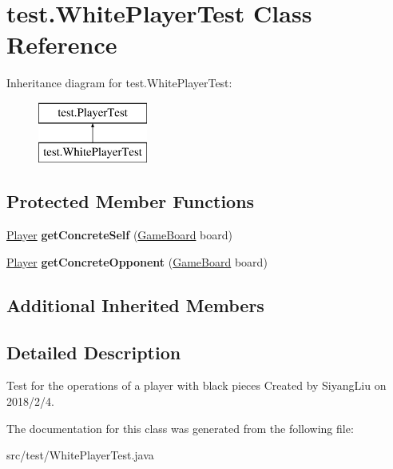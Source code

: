 \hypertarget{classtest_1_1_white_player_test}{}\section{test.\+White\+Player\+Test Class Reference}
\label{classtest_1_1_white_player_test}
Inheritance diagram for test.\+White\+Player\+Test\+:\begin{figure}[H]
\begin{center}
\leavevmode
\includegraphics[height=2.000000cm]{classtest_1_1_white_player_test}
\end{center}
\end{figure}
\subsection*{Protected Member Functions}
\begin{DoxyCompactItemize}
\item 
\mbox{\label{classtest_1_1_white_player_test_aa42ecc7ee1e37ba91c93278aeb4b56b7}} 
\mbox{\hyperlink{classplayers_1_1_player}{Player}} {\bfseries get\+Concrete\+Self} (\mbox{\hyperlink{classgameboard_1_1_game_board}{Game\+Board}} board)
\item 
\mbox{\label{classtest_1_1_white_player_test_abbc91632815e5a42f3e2f40094b8a120}} 
\mbox{\hyperlink{classplayers_1_1_player}{Player}} {\bfseries get\+Concrete\+Opponent} (\mbox{\hyperlink{classgameboard_1_1_game_board}{Game\+Board}} board)
\end{DoxyCompactItemize}
\subsection*{Additional Inherited Members}


\subsection{Detailed Description}
Test for the operations of a player with black pieces Created by Siyang\+Liu on 2018/2/4. 

The documentation for this class was generated from the following file\+:\begin{DoxyCompactItemize}
\item 
src/test/White\+Player\+Test.\+java\end{DoxyCompactItemize}

